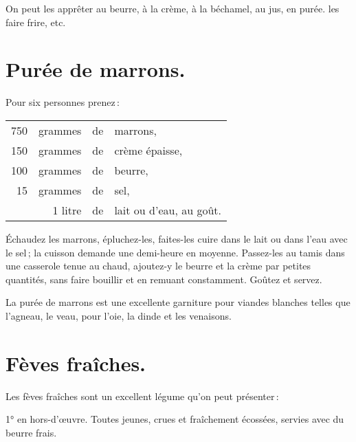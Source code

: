 On peut les apprêter au beurre, à la crème, à la béchamel, au jus, en purée. les
faire frire, etc.

\section*{\centering Purée de marrons.}
{}

Pour six personnes prenez :

\footnotesize
\begin{longtable}{rrrp{16em}}
    750 & grammes & de & marrons,                                                                         \\
    150 & grammes & de & crème épaisse,                                                                   \\
    100 & grammes & de & beurre,                                                                          \\
     15 & grammes & de & sel,                                                                             \\
        & 1 litre & de & lait ou d'eau, au goût.                                                          \\
\end{longtable}
\normalsize

Échaudez les marrons, épluchez-les, faites-les cuire dans le lait ou dans l’eau
avec le sel ; la cuisson demande une demi-heure en moyenne. Passez-les au tamis
dans une casserole tenue au chaud, ajoutez-y le beurre et la crème par petites
quantités, sans faire bouillir et en remuant constamment. Goûtez et servez.

\medskip

La purée de marrons est une excellente garniture pour viandes blanches telles
que l'agneau, le veau, pour l'oie, la dinde et les venaisons.

\section*{\centering Fèves fraîches.}
{}

Les fèves fraîches sont un excellent légume qu'on peut présenter :

1° en hors-d'œuvre. Toutes jeunes, crues et fraîchement écossées, servies avec
du beurre frais.

